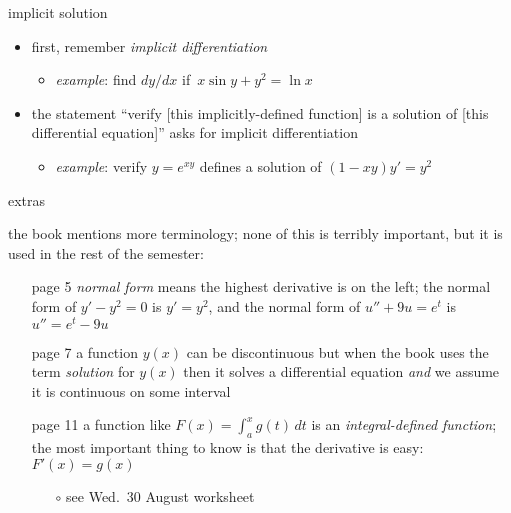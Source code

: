 \documentclass{beamer}
\begin{document}
\begin{frame}{implicit solution}

\begin{itemize}
\item first, remember \alert{\emph{implicit differentiation}}
    \begin{itemize}
    \item \emph{example}:  find $dy/dx$ if\, $x \sin y + y^2 = \ln x$
    \end{itemize}

\vspace{20mm}
\item the statement ``verify [this implicitly-defined function] is a solution of [this differential equation]'' asks for implicit differentiation
    \begin{itemize}
    \item \emph{example}:  verify $y=e^{xy}$ defines a solution of $(1-xy)y'=y^2$
    \end{itemize}

\vspace{30mm}
\end{itemize}
\end{frame}


\begin{frame}{extras}

the book mentions more terminology; none of this is terribly important, but it is used in the rest of the semester:
\begin{itemize}
\item[page 5] \emph{normal form} means the highest derivative is on the left; the normal form of $y' - y^2=0$ is $y'=y^2$, and the normal form of $u''+9u=e^t$ is $u'' = e^t - 9u$
\item[page 7] a function $y(x)$ can be discontinuous but when the book uses the term \emph{solution} for $y(x)$ then it solves a differential equation \emph{and} we assume it is continuous on some interval
\item[page 11] a function like $F(x) = \int_a^x g(t)\,dt$ is an \emph{integral-defined function}; the most important thing to know is that the derivative is easy: $F'(x)=g(x)$
    \begin{itemize}
    \item[$\circ$] see Wed.~30 August worksheet
    \end{itemize}
\end{itemize}
\end{frame}
\end{document}
